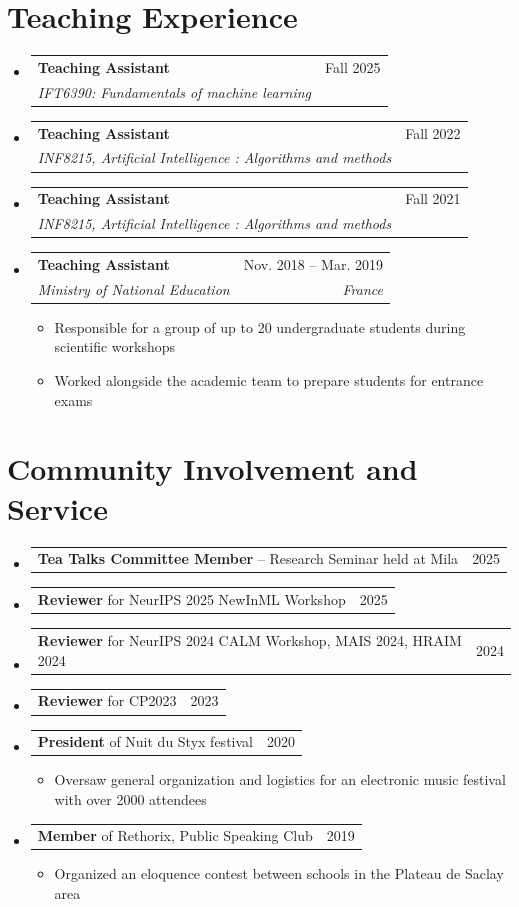 \documentclass[letterpaper,11pt]{article}
\makeatletter
\newcommand{\resumeItem}[1]{
  \item\small{
    {#1 \vspace{-2pt}}
  }
}
\newcommand{\resumeSubheading}[4]{
  \vspace{-2pt}\item
    \begin{tabular*}{0.97\textwidth}[t]{l@{\extracolsep{\fill}}r}
      \textbf{#1} & #2 \\
      \textit{\small#3} & \textit{\small #4} \\
    \end{tabular*}\vspace{-7pt}
}
\newcommand{\resumeProjectHeading}[2]{
    \item
    \begin{tabular*}{0.97\textwidth}{l@{\extracolsep{\fill}}r}
      \small#1 & #2 \\
    \end{tabular*}\vspace{-7pt}
}
\newcommand{\resumeSubHeadingListStart}{\begin{itemize}[leftmargin=0.15in, label={}]}
\newcommand{\resumeSubHeadingListEnd}{\end{itemize}}
\newcommand{\resumeItemListStart}{\begin{itemize}}
\newcommand{\resumeItemListEnd}{\end{itemize}\vspace{-5pt}}
\makeatother
\begin{document}
\section{Teaching Experience}
 \resumeSubHeadingListStart
     \resumeSubheading
      {Teaching Assistant}{Fall 2025}
      {IFT6390: Fundamentals of machine learning}{}
      
    \resumeSubheading
      {Teaching Assistant}{Fall 2022}
      {INF8215, Artificial Intelligence : Algorithms and methods}{}

        \resumeSubheading
      {Teaching Assistant}{Fall 2021}
      {INF8215, Artificial Intelligence : Algorithms and methods}{}

    \resumeSubheading
      {Teaching Assistant}{Nov. 2018 -- Mar. 2019}
      {Ministry of National Education}{France}
      \resumeItemListStart
        \resumeItem{Responsible for a group of up to 20 undergraduate students during scientific workshops}
        \resumeItem{Worked alongside the academic team to prepare students for entrance exams}

    \resumeItemListEnd
  \resumeSubHeadingListEnd

\section{Community Involvement and Service}
\resumeSubHeadingListStart
  \resumeProjectHeading
    {\textbf{Tea Talks Committee Member }– Research Seminar held at Mila}{2025}
  \resumeProjectHeading
    {\textbf{Reviewer} for NeurIPS 2025 NewInML Workshop}{2025}
  \resumeProjectHeading
    {\textbf{Reviewer} for NeurIPS 2024 CALM Workshop, MAIS 2024, HRAIM 2024}{2024}
  \resumeProjectHeading
    {\textbf{Reviewer} for CP2023}{2023}
  \resumeProjectHeading
    {\textbf{President} of Nuit du Styx festival}{2020}
    \resumeItemListStart
      \resumeItem{Oversaw general organization and logistics for an electronic music festival with over 2000 attendees}
    \resumeItemListEnd
  \resumeProjectHeading
    {\textbf{Member} of Rethorix, Public Speaking Club }{2019}
    \resumeItemListStart
      \resumeItem{Organized an eloquence contest between schools in the Plateau de Saclay area}
    \resumeItemListEnd

\resumeSubHeadingListEnd
\end{document}
